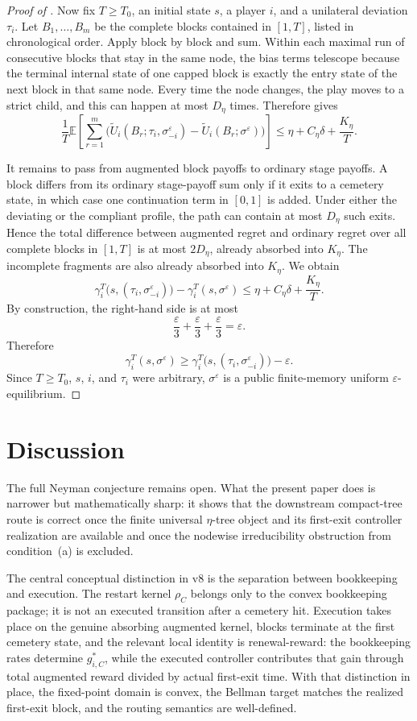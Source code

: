 \documentclass[12pt]{article}
\theoremstyle{definition}
\newcommand{\eps}{\varepsilon}
\newcommand{\E}{\mathbb{E}}
\newcommand{\1}{\mathbf{1}}
\begin{document}
\begin{proof}[Proof of ]
Now fix $T\ge T_0$, an initial state $s$, a player $i$, and a unilateral deviation
$\tau_i$. Let $B_1,\dots,B_m$ be the complete blocks contained in $[1,T]$, listed
in chronological order. Apply  block by block and sum.
Within each maximal run of consecutive blocks that stay in the same node, the bias
terms telescope because the terminal internal state of one capped block is exactly
the entry state of the next block in that same node. Every time the node changes,
the play moves to a strict child, and this can happen at most $D_\eta$ times.
Therefore  gives
\[
\frac1T\E\left[\sum_{r=1}^m
\bigl(
\widetilde U_i(B_r;\tau_i,\sigma^\eps_{-i})
-
\widetilde U_i(B_r;\sigma^\eps)
\bigr)\right]
\le
\eta + C_\eta\delta + \frac{K_\eta}{T}.
\]

It remains to pass from augmented block payoffs to ordinary stage payoffs. A block
differs from its ordinary stage-payoff sum only if it exits to a cemetery state,
in which case one continuation term in $[0,1]$ is added. Under either the
deviating or the compliant profile, the path can contain at most $D_\eta$ such
exits. Hence the total difference between augmented regret and ordinary regret over
all complete blocks in $[1,T]$ is at most $2D_\eta$, already absorbed into
$K_\eta$. The incomplete fragments are also already absorbed into $K_\eta$. We
obtain
\[
\gamma_i^T\bigl(s,(\tau_i,\sigma^\eps_{-i})\bigr)
-
\gamma_i^T(s,\sigma^\eps)
\le
\eta + C_\eta\delta + \frac{K_\eta}{T}.
\]
By construction, the right-hand side is at most
\[
\frac{\eps}{3}+\frac{\eps}{3}+\frac{\eps}{3}=\eps.
\]
Therefore
\[
\gamma_i^T(s,\sigma^\eps)
\ge
\gamma_i^T\bigl(s,(\tau_i,\sigma^\eps_{-i})\bigr)-\eps.
\]
Since $T\ge T_0$, $s$, $i$, and $\tau_i$ were arbitrary, $\sigma^\eps$ is a
public finite-memory uniform $\eps$-equilibrium.
\end{proof}


\section{Discussion}

The full Neyman conjecture remains open. What the present paper does is narrower
but mathematically sharp: it shows that the downstream compact-tree route is
correct once the finite universal $\eta$-tree object and its first-exit controller
realization are available and once the nodewise irreducibility obstruction from
condition~\textnormal{(a)} is excluded.

The central conceptual distinction in v8 is the separation between bookkeeping and
execution. The restart kernel $\rho_C$ belongs only to the convex bookkeeping
package; it is not an executed transition after a cemetery hit. Execution takes
place on the genuine absorbing augmented kernel, blocks terminate at the first
cemetery state, and the relevant local identity is renewal-reward: the bookkeeping
rates determine $g_{i,C}^*$, while the executed controller contributes that gain
through total augmented reward divided by actual first-exit time. With that
distinction in place, the fixed-point domain is convex, the Bellman target matches
the realized first-exit block, and the routing semantics are well-defined.
\end{document}
